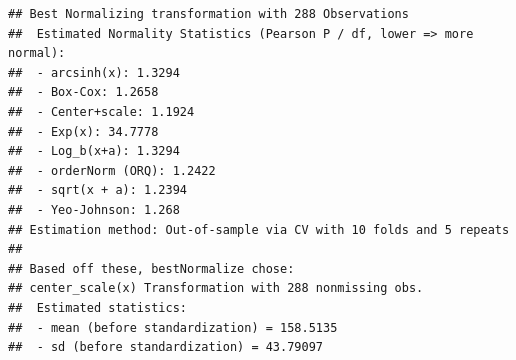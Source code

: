 \documentclass[
]{article}
\newenvironment{Shaded}{\begin{snugshade}}{\end{snugshade}}
\newcommand{\AttributeTok}[1]{\textcolor[rgb]{0.77,0.63,0.00}{#1}}
\newcommand{\CommentTok}[1]{\textcolor[rgb]{0.56,0.35,0.01}{\textit{#1}}}
\newcommand{\ConstantTok}[1]{\textcolor[rgb]{0.00,0.00,0.00}{#1}}
\newcommand{\DecValTok}[1]{\textcolor[rgb]{0.00,0.00,0.81}{#1}}
\newcommand{\FunctionTok}[1]{\textcolor[rgb]{0.00,0.00,0.00}{#1}}
\newcommand{\NormalTok}[1]{#1}
\newcommand{\OtherTok}[1]{\textcolor[rgb]{0.56,0.35,0.01}{#1}}
\newcommand{\SpecialCharTok}[1]{\textcolor[rgb]{0.00,0.00,0.00}{#1}}
\begin{document}
\begin{Shaded}
\end{Shaded}

\begin{verbatim}
## Best Normalizing transformation with 288 Observations
##  Estimated Normality Statistics (Pearson P / df, lower => more normal):
##  - arcsinh(x): 1.3294
##  - Box-Cox: 1.2658
##  - Center+scale: 1.1924
##  - Exp(x): 34.7778
##  - Log_b(x+a): 1.3294
##  - orderNorm (ORQ): 1.2422
##  - sqrt(x + a): 1.2394
##  - Yeo-Johnson: 1.268
## Estimation method: Out-of-sample via CV with 10 folds and 5 repeats
##  
## Based off these, bestNormalize chose:
## center_scale(x) Transformation with 288 nonmissing obs.
##  Estimated statistics:
##  - mean (before standardization) = 158.5135 
##  - sd (before standardization) = 43.79097
\end{verbatim}

\begin{Shaded}
\end{Shaded}
\end{document}

